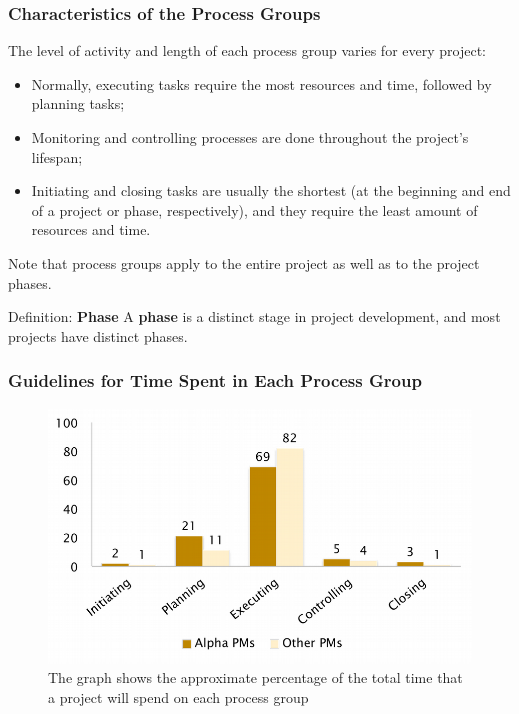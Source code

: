 \documentclass[aspectratio=169]{beamer}
\begin{document}
\begin{frame}
\frametitle{Characteristics of the Process Groups}
The level of activity and length of each process group varies for every project:
\begin{itemize}
\item Normally, executing tasks require the most resources and time, followed by planning tasks;
\item Monitoring and controlling processes are done throughout the project's lifespan;
\item Initiating and closing tasks are usually the shortest (at the beginning and end of a project or phase, respectively), and they require the least amount of resources and time.
\end{itemize}
Note that process groups apply to the entire project as well as to the project phases.
\vspace{0.5cm}
\begin{block}{Definition: \textbf{Phase}}
A \textbf{phase} is a distinct stage in project development, and most projects have distinct phases.
\end{block}
\end{frame}

\begin{frame}
\frametitle{Guidelines for Time Spent in Each Process Group}
\begin{figure}
\includegraphics[scale=0.45]{time_spent_proc}
\caption{The graph shows the approximate percentage of the total time that a project will spend on each process group}
\end{figure}
\end{frame}
\end{document}
